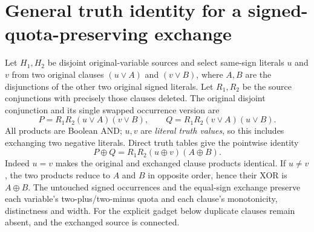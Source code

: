 \documentclass[11pt]{article}
\begin{document}
\section{General truth identity for a signed-quota-preserving exchange}
Let $H_1,H_2$ be disjoint original-variable sources and select same-sign literals $u$ and $v$ from two original clauses $(u\vee A)$ and $(v\vee B)$, where $A,B$ are the disjunctions of the other two original signed literals. Let $R_1,R_2$ be the source conjunctions with precisely those clauses deleted. The original disjoint conjunction and its single swapped occurrence version are
\[
 P=R_1R_2(u\vee A)(v\vee B),\qquad
 Q=R_1R_2(v\vee A)(u\vee B).
\]
All products are Boolean AND; $u,v$ are \emph{literal truth values}, so this includes exchanging two negative literals. Direct truth tables give the pointwise identity
\begin{equation}\label{eq:xor}
 \boxed{P\oplus Q=R_1R_2(u\oplus v)(A\oplus B).}
\end{equation}
Indeed $u=v$ makes the original and exchanged clause products identical. If $u\ne v$, the two products reduce to $A$ and $B$ in opposite order, hence their XOR is $A\oplus B$. The untouched signed occurrences and the equal-sign exchange preserve each variable's two-plus/two-minus quota and each clause's monotonicity, distinctness and width. For the explicit gadget below duplicate clauses remain absent, and the exchanged source is connected.
\end{document}
